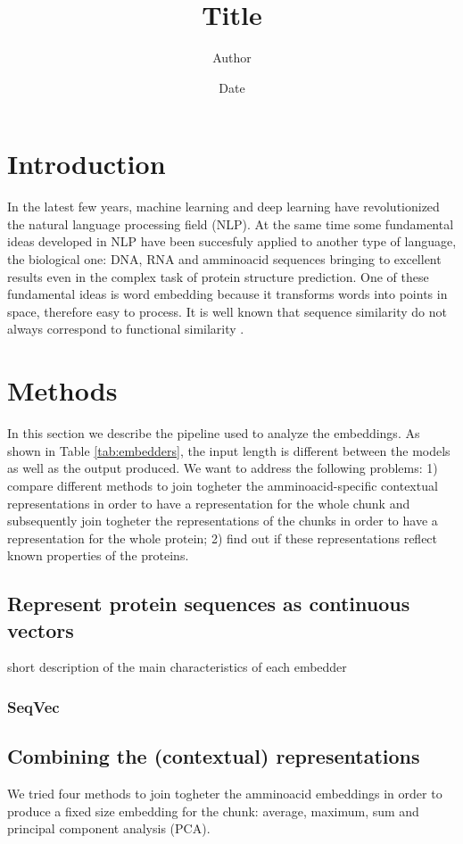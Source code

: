 \documentclass[12pt, letterpaper, twocolumn]{article}
\title{Title}
\author{Author}
\date{Date}
\begin{document}
\maketitle


\section{Introduction}
In the latest few years, machine learning and deep learning have revolutionized the natural language processing field (NLP)\cite{khurana2023natural}. At the same time some fundamental ideas developed in NLP have been succesfuly applied to another type of language, the biological one: DNA, RNA and amminoacid sequences bringing to excellent results even in the complex task of protein structure prediction\cite{jumper2021highly, lin2022language}. One of these fundamental ideas is word embedding \cite{mikolov2013efficient} because it transforms words into points in space, therefore easy to process.
It is well known that sequence similarity do not always correspond to functional similarity \cite{kosloff2008sequence}.

\section{Methods}

In this section we describe the pipeline used to analyze the embeddings. As shown in Table \ref{tab:embedders}, the input length is different between the models as well as the output produced. We want to address the following problems: 1) compare different methods to join togheter the amminoacid-specific contextual representations in order to have a representation for the whole chunk and subsequently join togheter the representations of the chunks in order to have a representation for the whole protein; 2) find out if these representations reflect known properties of the proteins.

\subsection{Represent protein sequences as continuous vectors}
short description of the main characteristics of each embedder 
\subsubsection{SeqVec}

\subsection{Combining the (contextual) representations}
We tried four methods to join togheter the amminoacid embeddings in order to produce a fixed size embedding for the chunk: average, maximum, sum and principal component analysis (PCA). 
\end{document}
